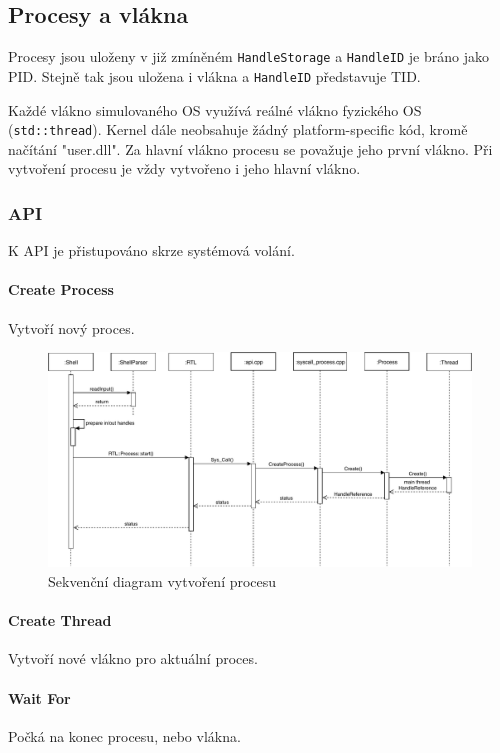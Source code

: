 \documentclass[11pt,a4paper]{scrartcl}
\begin{document}
	\subsection{Procesy a vlákna}
	
	Procesy jsou uloženy v již zmíněném \verb|HandleStorage| a \verb|HandleID| je bráno jako PID. Stejně tak jsou uložena i vlákna a \verb|HandleID| představuje TID.
	
	Každé vlákno simulovaného OS využívá reálné vlákno fyzického OS (\verb|std::thread|). Kernel dále neobsahuje žádný platform-specific kód, kromě načítání "user.dll". Za hlavní vlákno procesu se považuje jeho první vlákno. Při vytvoření procesu je vždy vytvořeno i jeho hlavní vlákno.
	
	\subsubsection{API}
	K API je přistupováno skrze systémová volání.
	
	\paragraph{Create Process}
	Vytvoří nový proces.
	
	\begin{figure}[H]
		\centering
		\includegraphics[width=14cm]{create-process-seq.pdf}
		\caption{Sekvenční diagram vytvoření procesu}
		\label{fig:create-process-seq}
	\end{figure}
	
	\paragraph{Create Thread}
	Vytvoří nové vlákno pro aktuální proces.
	
	\paragraph{Wait For}
	Počká na konec procesu, nebo vlákna.
	
\end{document}
